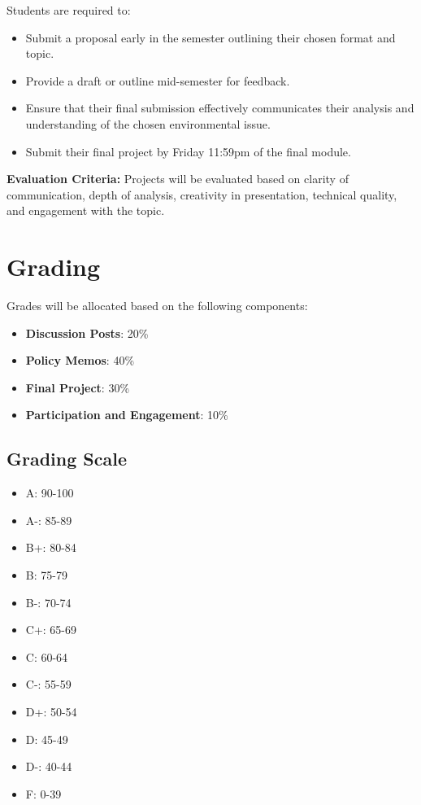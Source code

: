 \documentclass[12pt, letterpaper]{article}
\begin{document}
Students are required to:
\begin{itemize}
    \item Submit a proposal early in the semester outlining their chosen format and topic.
    \item Provide a draft or outline mid-semester for feedback.
    \item Ensure that their final submission effectively communicates their analysis and understanding of the chosen environmental issue.
    \item Submit their final project by Friday 11:59pm of the final module.
\end{itemize}

\textbf{Evaluation Criteria:} Projects will be evaluated based on clarity of communication, depth of analysis, creativity in presentation, technical quality, and engagement with the topic.

\section*{Grading}
Grades will be allocated based on the following components:
\begin{itemize}
    \item \textbf{Discussion Posts}: 20\%
    \item \textbf{Policy Memos}: 40\%
    \item \textbf{Final Project}: 30\%
    \item \textbf{Participation and Engagement}: 10\%
\end{itemize}

\subsection*{Grading Scale}

\begin{itemize}
    \item A: 90-100
    \item A-: 85-89
    \item B+: 80-84
    \item B: 75-79
    \item B-: 70-74
    \item C+: 65-69
    \item C: 60-64
    \item C-: 55-59
    \item D+: 50-54
    \item D: 45-49
    \item D-: 40-44
    \item F: 0-39
\end{itemize}
\end{document}
